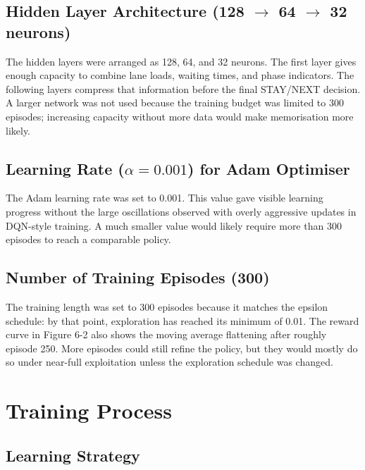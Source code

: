 \subsection{Hidden Layer Architecture (128 \( \rightarrow \) 64 \( \rightarrow \) 32 neurons)}

The hidden layers were arranged as 128, 64, and 32 neurons. The first
layer gives enough capacity to combine lane loads, waiting times, and
phase indicators. The following layers compress that information before
the final STAY/NEXT decision. A larger network was not used because the
training budget was limited to 300 episodes; increasing capacity without
more data would make memorisation more likely.

\subsection{Learning Rate (\( \alpha = 0.001 \)) for Adam Optimiser}

The Adam learning rate was set to 0.001. This value gave visible learning
progress without the large oscillations observed with overly aggressive
updates in DQN-style training. A much smaller value would likely require
more than 300 episodes to reach a comparable policy.

\subsection{Number of Training Episodes (300)}

The training length was set to 300 episodes because it matches the
epsilon schedule: by that point, exploration has reached its minimum of
0.01. The reward curve in Figure 6-2 also shows the moving average
flattening after roughly episode 250. More episodes could still refine
the policy, but they would mostly do so under near-full exploitation
unless the exploration schedule was changed.




\section{Training Process}
\label{sec:training_process}

\subsection{Learning Strategy}

